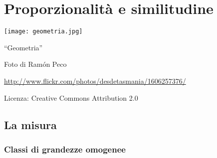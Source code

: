 
\chapter{Proporzionalità e similitudine}

\texttt{[image: geometria.jpg]}
  \begin{center}
    {\large ``Geometria''}\par
    Foto di Ram\'on Peco\par
    \url{http://www.flickr.com/photos/desdetasmania/1606257376/}\par
    Licenza: Creative Commons Attribution 2.0\par
  \end{center}
\newpage


\section{La misura}\label{sect:misura2}

\subsection{Classi di grandezze omogenee}

